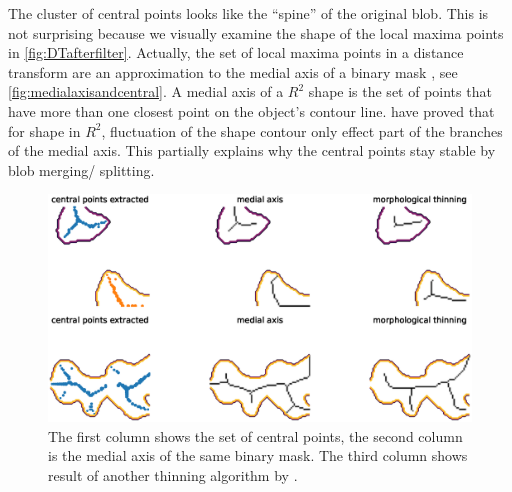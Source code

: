 The cluster of central points looks like the ``spine'' of the original blob. This is not surprising because we visually examine the shape of the local maxima points in \autoref{fig:DTafterfilter}. Actually, the set of local maxima points in a distance transform are an approximation to the medial axis of a binary mask \cite{lee1996chessboard}, see \autoref{fig:medialaxisandcentral}. A medial axis of a $R^2$ shape is the set of points that have more than one closest point on the object's contour line. \citeauthor{attali2009stability} \cite{attali2009stability} have proved that for shape in $R^2$, fluctuation of the shape contour only effect part of the branches of the medial axis. This partially explains why the central points stay stable by blob merging/ splitting.
\begin{figure}
  \centering
  \includegraphics[width=\textwidth]{figures/centralandmedial.eps}
  \caption{The first column shows the set of central points, the second column is the medial axis of the same binary mask. The third column shows result of another thinning algorithm by \cite{zhang1984fast}.}\label{fig:medialaxisandcentral}
\end{figure}



